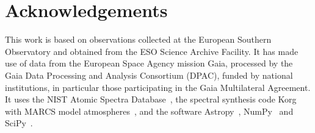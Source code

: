 \documentclass[3p,11pt]{elsarticle}
\begin{document}
\section*{Acknowledgements}

This work is based on observations collected at the European Southern Observatory and
obtained from the ESO Science Archive Facility. It has made use of data from the
European Space Agency mission Gaia, processed by the Gaia Data Processing and Analysis
Consortium (DPAC), funded by national institutions, in particular those participating
in the Gaia Multilateral Agreement. It uses the NIST Atomic Spectra
Database~\cite{NIST}, the spectral synthesis code Korg~\cite{Wheeler2023} with MARCS
model atmospheres~\cite{Gustafsson2008}, and the software Astropy~\cite{Astropy2022},
NumPy~\cite{Harris2020} and SciPy~\cite{Virtanen2020}.
\end{document}
